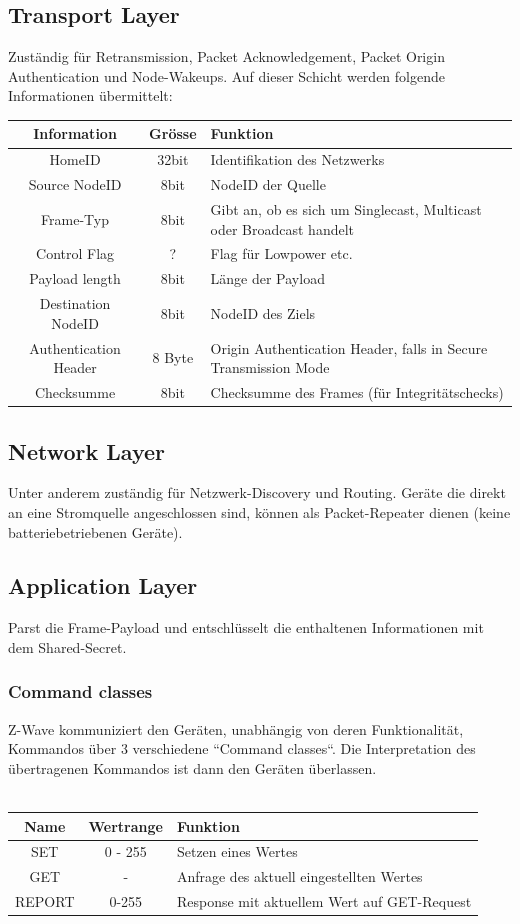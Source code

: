 \documentclass[a4paper,11pt]{article}
\begin{document}
\subsection*{Transport Layer}
Zuständig für Retransmission, Packet Acknowledgement, Packet Origin Authentication und Node-Wakeups. Auf dieser Schicht werden folgende Informationen übermittelt:\\
\begin{tabular}{| c | c | p{10cm} |}
	\hline
	\textbf{Information} & \textbf{Grösse}& \textbf{Funktion}\\\hline
	HomeID & 32bit & Identifikation des Netzwerks \\\hline
	Source NodeID & 8bit & NodeID der Quelle \\\hline
	Frame-Typ & 8bit & Gibt an, ob es sich um Singlecast, Multicast oder Broadcast handelt\\\hline
	Control Flag & ? & Flag für Lowpower etc.\\\hline
	Payload length & 8bit & Länge der Payload\\\hline
	Destination NodeID & 8bit & NodeID des Ziels \\\hline
	Authentication Header & 8 Byte & Origin Authentication Header, falls in Secure Transmission Mode\\\hline
	Checksumme & 8bit & Checksumme des Frames (für Integritätschecks)\\\hline
\end{tabular}

\subsection*{Network Layer}
Unter anderem zuständig für Netzwerk-Discovery und Routing. Geräte die direkt an eine Stromquelle angeschlossen sind, können als Packet-Repeater dienen (keine batteriebetriebenen Geräte).

\subsection*{Application Layer}
Parst die Frame-Payload und entschlüsselt die enthaltenen Informationen mit dem Shared-Secret.

\subsubsection*{Command classes}
Z-Wave kommuniziert den Geräten, unabhängig von deren Funktionalität, Kommandos über 3 verschiedene ``Command classes``. Die Interpretation des übertragenen Kommandos ist dann den Geräten überlassen.\\\\
\begin{tabular}{| c | c | p{6cm} |}
	\hline
	\textbf{Name} & \textbf{Wertrange}& \textbf{Funktion}\\\hline
	SET & 0 - 255 & Setzen eines Wertes \\\hline
	GET & - & Anfrage des aktuell eingestellten Wertes \\\hline
	REPORT & 0-255 & Response mit aktuellem Wert auf GET-Request\\\hline
\end{tabular}
~
\newpage
\end{document}
